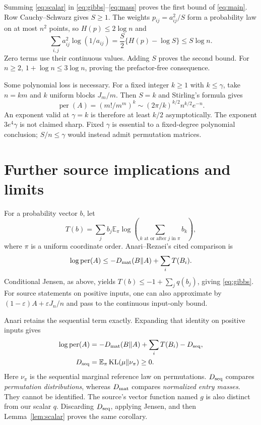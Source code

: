 \documentclass[11pt]{article}
\newcommand{\per}{\operatorname{per}}
\newcommand{\KL}{\operatorname{KL}}
\newcommand{\E}{\mathbb E}
\begin{document}
Summing \eqref{eq:scalar} in \eqref{eq:gibbs}--\eqref{eq:mass} proves the first bound of \eqref{eq:main}. Row Cauchy--Schwarz gives $S\ge1$. The weights $p_{ij}=a_{ij}^2/S$ form a probability law on at most $n^2$ points, so $H(p)\le2\log n$ and
\[
 \sum_{i,j}a_{ij}^2\log(1/a_{ij})
 =\frac S2\{H(p)-\log S\}\le S\log n.
\]
Zero terms use their continuous values. Adding $S$ proves the second bound. For $n\ge2$, $1+\log n\le3\log n$, proving the prefactor-free consequence.

Some polynomial loss is necessary. For a fixed integer $k\ge1$ with $k\le\gamma$, take $n=km$ and $k$ uniform blocks $J_m/m$. Then $S=k$ and Stirling's formula gives
\[
 \per(A)=(m!/m^m)^k\sim (2\pi/k)^{k/2}n^{k/2}e^{-n}.
\]
An exponent valid at $\gamma=k$ is therefore at least $k/2$ asymptotically. The exponent $3e^4\gamma$ is not claimed sharp. Fixed $\gamma$ is essential to a fixed-degree polynomial conclusion; $S/n\le\gamma$ would instead admit permutation matrices.

\section{Further source implications and limits}
For a probability vector $b$, let
\[
 T(b)=\sum_jb_j\E_{\pi}\log\left(\sum_{k\text{ at or after }j\text{ in }\pi}b_k\right),
\]
where $\pi$ is a uniform coordinate order. Anari--Rezaei's cited comparison is
\[\log\per(A)\le-D_{\rm mat}(B\Vert A)+\sum_iT(B_i).\]
Conditional Jensen, as above, yields $T(b)\le-1+\sum_jq(b_j)$, giving \eqref{eq:gibbs}. For source statements on positive inputs, one can also approximate by $(1-\varepsilon)A+\varepsilon J_n/n$ and pass to the continuous input-only bound.

Anari \cite[\S4, Lemma~7, Eq.~(24), pp.~9--10]{A26} retains the sequential term exactly. Expanding that identity on positive inputs gives
\begin{align*}
 \log\per(A)&=-D_{\rm mat}(B\Vert A)+\sum_iT(B_i)-D_{\rm seq},\\
 D_{\rm seq}&=\E_{\pi}\KL(\mu\Vert\nu_{\pi})\ge0.
\end{align*}
Here $\nu_{\pi}$ is the sequential marginal reference law on permutations. $D_{\rm seq}$ compares \emph{permutation distributions}, whereas $D_{\rm mat}$ compares \emph{normalized entry masses}. They cannot be identified. The source's vector function named $g$ is also distinct from our scalar $q$. Discarding $D_{\rm seq}$, applying Jensen, and then Lemma~\ref{lem:scalar} proves the same corollary.
\end{document}
